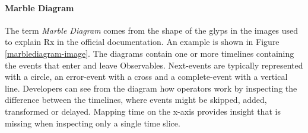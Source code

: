 \paragraph{Marble Diagram}%
\label{marblediagram} The term \textit{Marble Diagram} comes from the
shape of the glyps in the images used to explain Rx in the official
documentation.  An example is shown in Figure~%
\ref{marblediagram-image}.  The diagrams contain one or more timelines
containing the events that enter and leave Observables.  Next-events are
typically represented with a circle, an error-event with a cross and a
complete-event with a vertical line.  Developers can see from the
diagram how operators work by inspecting the difference between the
timelines, where events might be skipped, added, transformed or delayed.
Mapping time on the x-axis provides insight that is missing when
inspecting only a single time slice.
